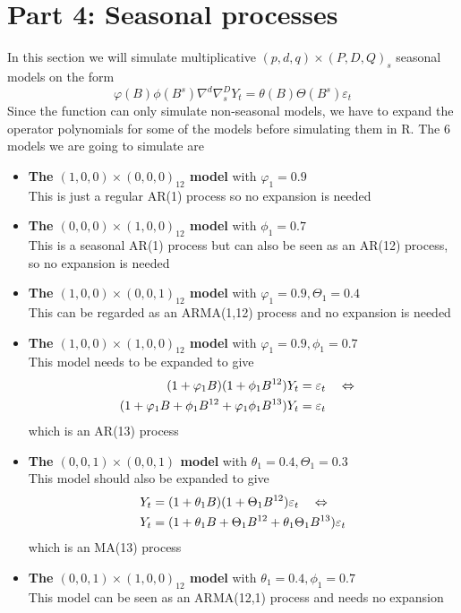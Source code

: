\section*{Part 4: Seasonal processes}
In this section we will simulate multiplicative $(p,d,q)\times(P,D,Q)_s$ seasonal models on the form
\begin{equation*}
    \varphi(B)\phi(B^s)\nabla^d\nabla^D_sY_t = \theta(B)\Theta(B^s)\varepsilon_t
\end{equation*}
Since the  function can only simulate non-seasonal models, we have to expand the operator polynomials for some of the models before simulating them in R. The 6 models we are going to simulate are
\begin{itemize}
    \item \textbf{The $(1,0,0)\times(0,0,0)_{12}$ model} with $\varphi_1=0.9$\\
        This is just a regular AR(1) process so no expansion is needed
    \item \textbf{The $(0,0,0)\times(1,0,0)_{12}$ model} with $\phi_1=0.7$\\
        This is a seasonal AR(1) process but can also be seen as an AR(12) process, so no expansion is needed
    \item \textbf{The $(1,0,0)\times(0,0,1)_{12}$ model} with $\varphi_1=0.9, \Theta_1=0.4$\\
        This can be regarded as an ARMA(1,12) process and no expansion is needed
    \item \textbf{The $(1,0,0)\times(1,0,0)_{12}$ model} with $\varphi_1=0.9, \phi_1=0.7$\\
        This model needs to be expanded to give
        \begin{align*}
            (1 + \varphi_1 B)(1 + \phi_1 B^{12})Y_t &= \varepsilon_t \quad\Leftrightarrow\quad\\
            (1 + \varphi_1 B + \phi_1 B^{12} + \varphi_1\phi_1 B^{13})Y_t &= \varepsilon_t
        \end{align*}
        which is an AR(13) process
    \item \textbf{The $(0,0,1)\times(0,0,1)$ model} with $\theta_1=0.4, \Theta_1=0.3$\\
        This model should also be expanded to give
        \begin{align*}
            Y_t &= (1 + \theta_1 B)(1 + \Theta_1 B^{12})\varepsilon_t \quad\Leftrightarrow\quad\\
            Y_t &= (1 + \theta_1 B + \Theta_1 B^{12} + \theta_1\Theta_1 B^{13})\varepsilon_t
        \end{align*}
        which is an MA(13) process
    \item \textbf{The $(0,0,1)\times(1,0,0)_{12}$ model} with $\theta_1=0.4, \phi_1=0.7$\\
        This model can be seen as an ARMA(12,1) process and needs no expansion
\end{itemize}
